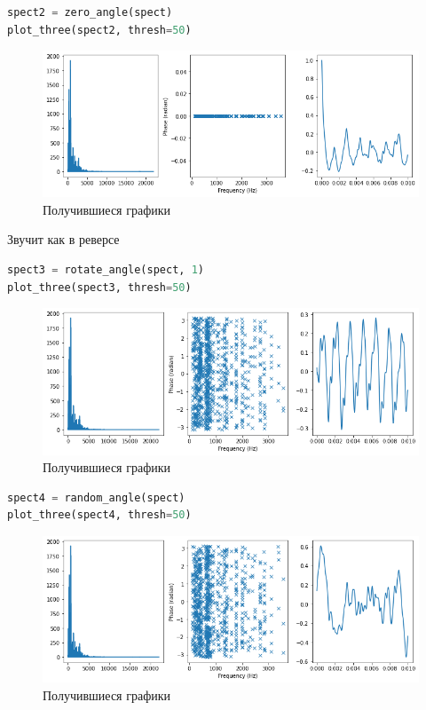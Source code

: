 \begin{lstlisting}[language=Python]
spect2 = zero_angle(spect)
plot_three(spect2, thresh=50)
\end{lstlisting}

\begin{figure}[H]
	\begin{center}
		\includegraphics[scale=0.66]{fig/lab06/lab06_16.png}
		\caption{Получившиеся графики}
	\end{center}
\end{figure}

Звучит как в реверсе

\begin{lstlisting}[language=Python]
spect3 = rotate_angle(spect, 1)
plot_three(spect3, thresh=50)
\end{lstlisting}

\begin{figure}[H]
	\begin{center}
		\includegraphics[scale=0.66]{fig/lab06/lab06_17.png}
		\caption{Получившиеся графики}
	\end{center}
\end{figure}

\begin{lstlisting}[language=Python]
spect4 = random_angle(spect)
plot_three(spect4, thresh=50)
\end{lstlisting}

\begin{figure}[H]
	\begin{center}
		\includegraphics[scale=0.66]{fig/lab06/lab06_18.png}
		\caption{Получившиеся графики}
	\end{center}
\end{figure}

